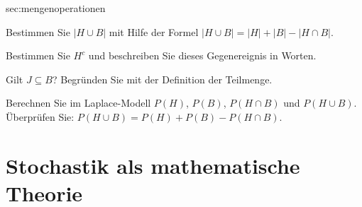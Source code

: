\documentclass[../Mathe_Aufgaben.tex]{subfiles}
\begin{document}
\begin{komplexaufgaben}{sec:mengenoperationen}
{		\item Bestimmen Sie $|H \cup B|$ mit Hilfe der Formel $|H \cup B| = |H| + |B| - |H \cap B|$.

		\item Bestimmen Sie $H^c$ und beschreiben Sie dieses Gegenereignis in Worten.

		\item Gilt $J \subseteq B$? Begründen Sie mit der Definition der Teilmenge.

		\item Berechnen Sie im Laplace-Modell $P(H)$, $P(B)$, $P(H \cap B)$ und $P(H \cup B)$.
			Überprüfen Sie: $P(H \cup B) = P(H) + P(B) - P(H \cap B)$.
	}

\end{komplexaufgaben}


\section{Stochastik als mathematische Theorie}
\label{sec:stochTheorie}
\end{document}
